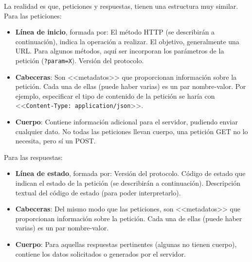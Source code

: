 La realidad es que, peticiones y respuestas, tienen una estructura muy similar. Para las peticiones:
\begin{itemize}
	\item \textbf{Línea de inicio}, formada por:
  \subitem El método HTTP (se describirán a continuación), indica la operación a realizar.
  \subitem El objetivo, generalmente una URL. Para algunos métodos, aquí ser
  incorporan los parámetros de la petición (\texttt{?param=X}).
  \subitem Versión del protocolo.
	\item \textbf{Cabeceras}: Son <<metadatos>> que proporcionan información sobre la
  petición. Cada una de ellas (puede haber varias) es un par nombre-valor.	Por
  ejemplo, especificar el tipo de contenido de la petición se haría con
  <<\texttt{Content-Type: application/json}>>.
  \item \textbf{Cuerpo}: Contiene información adicional para el servidor, pudiendo enviar
  cualquier dato. No todas las peticiones llevan cuerpo, una petición GET no lo
  necesita, pero sí un POST.
\end{itemize}

Para las respuestas:
\begin{itemize}
	\item \textbf{Línea de estado}, formada por:
  \subitem Versión del protocolo.
  \subitem Código de estado que indican el estado de la petición (se describirán a continuación).
  \subitem Descripción textual del código de estado (para poder interpretarlo).
	\item \textbf{Cabeceras}: Del mismo modo que las peticiones, son <<metadatos>> que
  proporcionan información sobre la petición. Cada una de ellas (puede haber
  varias) es un par nombre-valor.
  \item \textbf{Cuerpo}: Para aquellas respuestas pertinentes (algunas no tienen cuerpo),
  contiene los datos solicitados o generados por el servidor.
\end{itemize}


